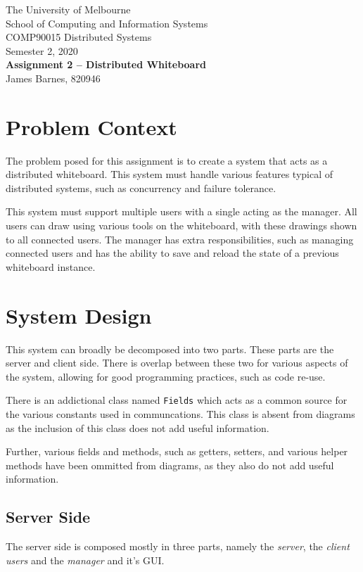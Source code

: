 \documentclass[12pt]{article}
\begin{document}
\begin{center}
  {\sc The University of Melbourne \\
  School of Computing and Information Systems \\ 
  COMP90015 Distributed Systems\\
  Semester 2, 2020}
  \bigskip \\
  {\Large\bf Assignment 2 -- Distributed Whiteboard}
  \bigskip \\
  {\large James Barnes, 820946}
\end{center}

\section{Problem Context}
The problem posed for this assignment is to create a system that acts as a distributed whiteboard. This system must handle various features typical of distributed systems, such as concurrency and failure tolerance.

This system must support multiple users with a single acting as the manager. All users can draw using various tools on the whiteboard, with these drawings shown to all connected users. The manager has extra responsibilities, such as managing connected users and has the ability to save and reload the state of a previous whiteboard instance.

\section{System Design}
This system can broadly be decomposed into two parts. These parts are the server and client side. There is overlap between these two for various aspects of the system, allowing for good programming practices, such as code re-use.

There is an addictional class named \texttt{Fields} which acts as a common source for the various constants used in communcations. This class is absent from diagrams as the inclusion of this class does not add useful information.

Further, various fields and methods, such as getters, setters, and various helper methods have been ommitted from diagrams, as they also do not add useful information.

\newpage

\subsection{Server Side}
The server side is composed mostly in three parts, namely the \textit{server}, the \textit{client users} and the \textit{manager} and it's GUI.
\end{document}
